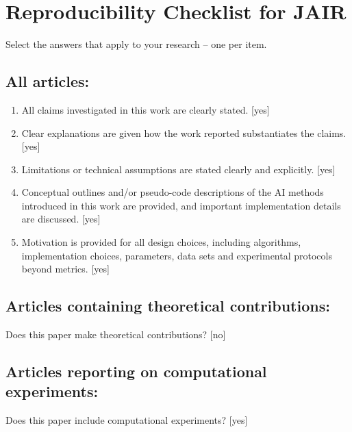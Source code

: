 \ifarxiv\else
\section{Reproducibility Checklist for JAIR}

Select the answers that apply to your research -- one per item.

\subsection*{All articles:}

\begin{enumerate}
    \item All claims investigated in this work are clearly stated.
    [yes]
    \item Clear explanations are given how the work reported substantiates the claims.
    [yes]
    \item Limitations or technical assumptions are stated clearly and explicitly.
    [yes]
    \item Conceptual outlines and/or pseudo-code descriptions of the AI methods introduced in this work are provided, and important implementation details are discussed.
    [yes]
    \item
    Motivation is provided for all design choices, including algorithms, implementation choices, parameters, data sets and experimental protocols beyond metrics.
    [yes]
\end{enumerate}

\subsection*{Articles containing theoretical contributions:}
Does this paper make theoretical contributions?
[no]

\subsection*{Articles reporting on computational experiments:}
Does this paper include computational experiments? [yes]

